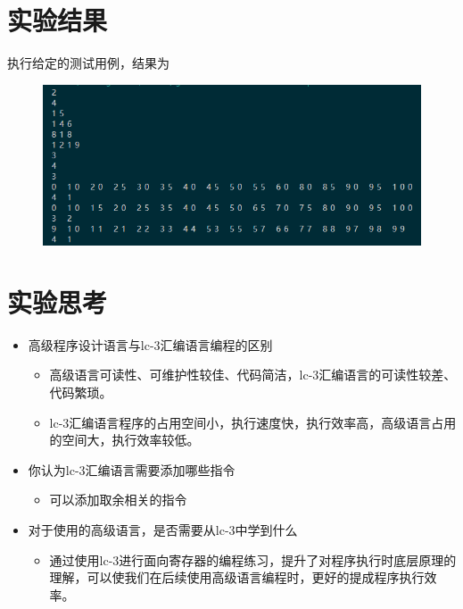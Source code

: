 \documentclass[12pt, a4paper, oneside]{ctexart}
\begin{document}
\section*{实验结果}
执行给定的测试用例，结果为
\begin{figure}[H]
    \centering
    \includegraphics[scale=0.6]{1.png}
\end{figure}
\section*{实验思考}
\begin{itemize}
    \item 高级程序设计语言与lc-3汇编语言编程的区别
    \begin{itemize}
        \item 高级语言可读性、可维护性较佳、代码简洁，lc-3汇编语言的可读性较差、代码繁琐。
        \item lc-3汇编语言程序的占用空间小，执行速度快，执行效率高，高级语言占用的空间大，执行效率较低。
    \end{itemize}
    \item 你认为lc-3汇编语言需要添加哪些指令
    \begin{itemize}
        \item 可以添加取余相关的指令
    \end{itemize}
    \item 对于使用的高级语言，是否需要从lc-3中学到什么
    \begin{itemize}
        \item 通过使用lc-3进行面向寄存器的编程练习，提升了对程序执行时底层原理的理解，可以使我们在后续使用高级语言编程时，更好的提成程序执行效率。
    \end{itemize}
\end{itemize}
\end{document}
